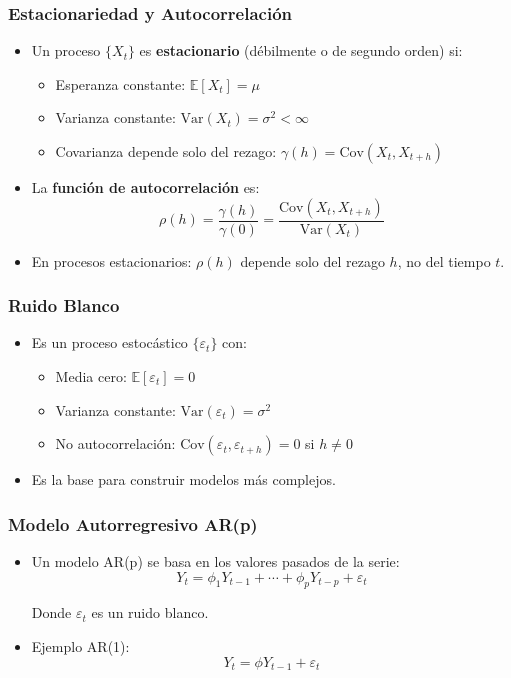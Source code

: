 \documentclass{beamer}
\begin{document}
\begin{frame}
\frametitle{Estacionariedad y Autocorrelación}
\begin{itemize}
    \item  Un proceso \(\{X_t\}\) es \textbf{estacionario } (débilmente o de segundo orden) si:
    \begin{itemize}
        \item Esperanza constante: \(\mathbb{E}[X_t] = \mu\)
        \item Varianza constante: \(\text{Var}(X_t) = \sigma^2 < \infty\)
        \item Covarianza depende solo del rezago: \(\gamma(h) = \text{Cov}(X_t, X_{t+h})\)
    \end{itemize}
    \item La \textbf{función de autocorrelación} es:
    \[
    \rho(h) = \frac{\gamma(h)}{\gamma(0)} = \frac{\text{Cov}(X_t, X_{t+h})}{\text{Var}(X_t)}
    \]
    \item En procesos estacionarios: \(\rho(h)\) depende solo del rezago \(h\), no del tiempo \(t\).
\end{itemize}
\end{frame}

\begin{frame}
\frametitle{Ruido Blanco}
\begin{itemize}
    \item Es un proceso estocástico \(\{\varepsilon_t\}\) con:
    \begin{itemize}
        \item Media cero: \(\mathbb{E}[\varepsilon_t] = 0\)
        \item Varianza constante: \(\text{Var}(\varepsilon_t) = \sigma^2\)
        \item No autocorrelación: \(\text{Cov}(\varepsilon_t, \varepsilon_{t+h}) = 0\) si \(h \neq 0\)
    \end{itemize}
    \item Es la base para construir modelos más complejos.
\end{itemize}
\end{frame}
\begin{frame}
\frametitle{Modelo Autorregresivo AR(p)}
\begin{itemize}
    \item Un modelo AR(p) se basa en los valores pasados de la serie:
    \[
    Y_t = \phi_1 Y_{t-1} + \cdots + \phi_p Y_{t-p} + \varepsilon_t \]

     Donde $\varepsilon_t$ es un ruido blanco.

    \item Ejemplo AR(1):
     \[
     Y_t = \phi Y_{t-1} + \varepsilon_t
     \]
\end{itemize}
 \end{frame}
\end{document}
